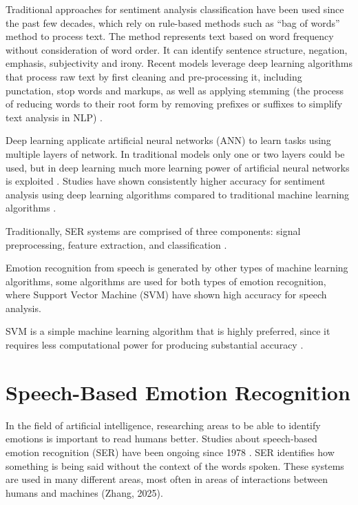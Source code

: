 Traditional approaches for sentiment analysis classification have been used since the past few decades, which rely on rule-based methods such as “bag of words” method to process text. The method represents text based on word frequency without consideration of word order. It can identify sentence structure, negation, emphasis, subjectivity and irony. Recent models leverage deep learning algorithms that process raw text by first cleaning and pre-processing it, including punctation, stop words and markups, as well as applying stemming (the process of reducing words to their root form by removing prefixes or suffixes to simplify text analysis in NLP) \autocite{Kansara2020}. 

 Deep learning applicate artificial neural networks (ANN) to learn tasks using multiple layers of network. In traditional models only one or two layers could be used, but in deep learning much more learning power of artificial neural networks is exploited \autocite{Zhang2018}. Studies have shown consistently higher accuracy for sentiment analysis using deep learning algorithms compared to traditional machine learning algorithms \autocite{Kansara2020}.

 Traditionally, SER systems are comprised of three components: signal preprocessing, feature extraction, and classification \autocite{Sahoo2023}.

Emotion recognition from speech is generated by other types of machine learning algorithms, some algorithms are used for both types of emotion recognition, where Support Vector Machine (SVM) have shown high accuracy for speech analysis. 

SVM is a simple machine learning algorithm that is highly preferred, since it requires less computational power for producing substantial accuracy \autocite{Kusal2024}.

 

\section{Speech-Based Emotion Recognition}

 In the field of artificial intelligence, researching areas to be able to identify emotions is important to read humans better. Studies about speech-based emotion recognition (SER) have been ongoing since 1978 \autocite{LGENSNMEZ2024}. SER identifies how something is being said without the context of the words spoken. These systems are used in many different areas, most often in areas of interactions between humans and machines (Zhang, 2025). 

